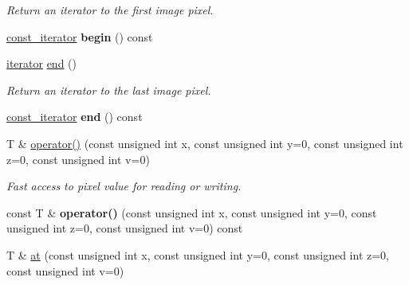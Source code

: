 \begin{DoxyCompactItemize}
\begin{DoxyCompactList}\small\item\em Return an iterator to the first image pixel. \end{DoxyCompactList}\item 
\hypertarget{structcimg__library_1_1_c_img_a726390b02650851b9195cdef48248fad}{\hyperlink{structcimg__library_1_1_c_img_ad444f21017aaa7da6fab45930d3579aa}{const\-\_\-iterator} {\bfseries begin} () const }\label{structcimg__library_1_1_c_img_a726390b02650851b9195cdef48248fad}

\item 
\hypertarget{structcimg__library_1_1_c_img_a2583162076af8bfeed05f8f01d31ae05}{\hyperlink{structcimg__library_1_1_c_img_a3ff3f07802e67c4ba930427ea45655c8}{iterator} \hyperlink{structcimg__library_1_1_c_img_a2583162076af8bfeed05f8f01d31ae05}{end} ()}\label{structcimg__library_1_1_c_img_a2583162076af8bfeed05f8f01d31ae05}

\begin{DoxyCompactList}\small\item\em Return an iterator to the last image pixel. \end{DoxyCompactList}\item 
\hypertarget{structcimg__library_1_1_c_img_abf353a45f812becefe49ee27bc0a4f73}{\hyperlink{structcimg__library_1_1_c_img_ad444f21017aaa7da6fab45930d3579aa}{const\-\_\-iterator} {\bfseries end} () const }\label{structcimg__library_1_1_c_img_abf353a45f812becefe49ee27bc0a4f73}

\item 
T \& \hyperlink{structcimg__library_1_1_c_img_ac26d10a2b16190e0f4949a009250d041}{operator()} (const unsigned int x, const unsigned int y=0, const unsigned int z=0, const unsigned int v=0)
\begin{DoxyCompactList}\small\item\em Fast access to pixel value for reading or writing. \end{DoxyCompactList}\item 
\hypertarget{structcimg__library_1_1_c_img_a9b4449bca2023d43f3b4b9e973072680}{const T \& {\bfseries operator()} (const unsigned int x, const unsigned int y=0, const unsigned int z=0, const unsigned int v=0) const }\label{structcimg__library_1_1_c_img_a9b4449bca2023d43f3b4b9e973072680}

\item 
\hypertarget{structcimg__library_1_1_c_img_a6548e89af57209fe85dd65a8af7ad43b}{T \& \hyperlink{structcimg__library_1_1_c_img_a6548e89af57209fe85dd65a8af7ad43b}{at} (const unsigned int x, const unsigned int y=0, const unsigned int z=0, const unsigned int v=0)}\label{structcimg__library_1_1_c_img_a6548e89af57209fe85dd65a8af7ad43b}


\end{DoxyCompactItemize}
